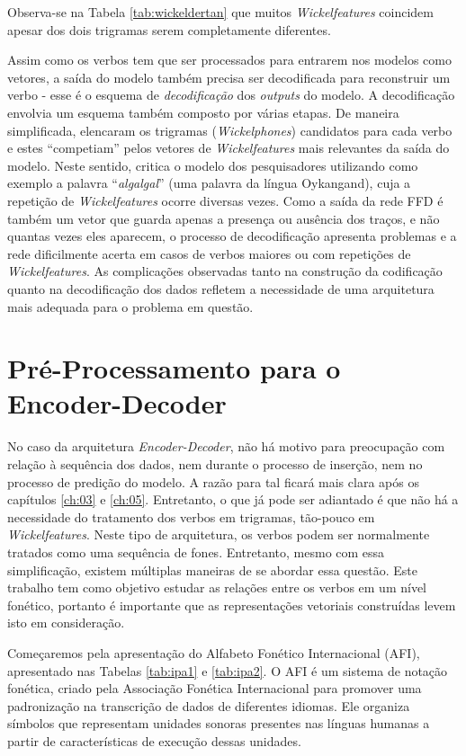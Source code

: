 Observa-se na Tabela \ref{tab:wickeldertan} que muitos \textit{Wickelfeatures} coincidem apesar dos dois trigramas serem completamente diferentes. 

Assim como os verbos tem que ser processados para entrarem nos modelos como vetores, a saída do modelo também precisa ser decodificada para reconstruir um verbo -  esse é o esquema de \textit{decodificação} dos \textit{outputs} do modelo. A decodificação envolvia um esquema também composto por várias etapas. De maneira simplificada, \cite{rumelhart:1986} elencaram os trigramas (\textit{Wickelphones}) candidatos para cada verbo e estes “competiam” pelos vetores de \textit{Wickelfeatures} mais relevantes da saída do modelo. Neste sentido, \cite{Pinker:1999} critica o modelo dos pesquisadores utilizando como exemplo a palavra “\textit{algalgal}” (uma palavra da língua Oykangand), cuja a repetição de \textit{Wickelfeatures} ocorre diversas vezes. Como a saída da rede FFD é também um vetor que guarda apenas a presença ou ausência dos traços, e não quantas vezes eles aparecem, o processo de decodificação apresenta problemas e a rede dificilmente acerta em casos de verbos maiores ou com repetições de \textit{Wickelfeatures}. As complicações observadas tanto na construção da codificação quanto na decodificação dos dados refletem a necessidade de uma arquitetura mais adequada para o problema em questão.

\section{Pré-Processamento para o Encoder-Decoder}

No caso da arquitetura \textit{Encoder-Decoder}, não há motivo para preocupação com relação à sequência dos dados, nem durante o processo de inserção, nem no processo de predição do modelo. A razão para tal ficará mais clara após os capítulos \ref{ch:03} e \ref{ch:05}. Entretanto, o que já pode ser adiantado é que não há a necessidade do tratamento dos verbos em trigramas, tão-pouco em \textit{Wickelfeatures}. Neste tipo de arquitetura, os verbos podem ser normalmente tratados como uma sequência de fones. Entretanto, mesmo com essa simplificação, existem múltiplas maneiras de se abordar essa questão. Este trabalho tem como objetivo estudar as relações entre os verbos em um nível fonético, portanto é importante que as representações vetoriais construídas levem isto em consideração.

Começaremos pela apresentação do Alfabeto Fonético Internacional (AFI), apresentado nas Tabelas \ref{tab:ipa1} e \ref{tab:ipa2}. O AFI é um sistema de notação fonética, criado pela Associação Fonética Internacional para promover uma padronização na transcrição de dados de diferentes idiomas. Ele organiza símbolos que representam unidades sonoras presentes nas línguas humanas a partir de características de execução dessas unidades. 

